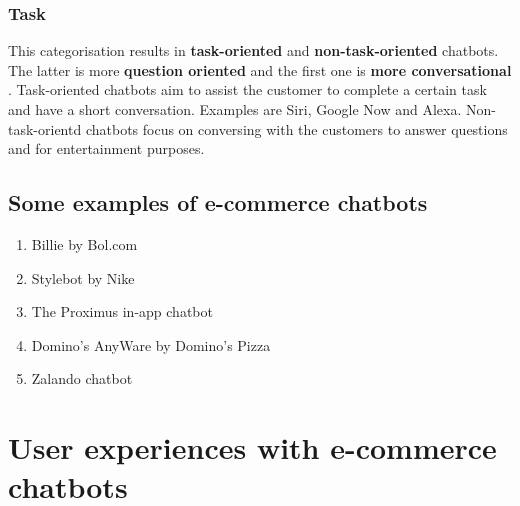 \subsubsection{Task}
This categorisation results in \textbf{task-oriented} and \textbf{non-task-oriented} chatbots. The latter is more \textbf{question oriented} and the first one is \textbf{more conversational} \citep{Nuruzzaman2018}. Task-oriented chatbots aim to assist the customer to complete a certain task and have a short conversation. Examples are Siri, Google Now and Alexa. Non-task-orientd chatbots focus on conversing with the customers to answer questions and for entertainment purposes. \citep{Nuruzzaman2018}\\

\subsection{Some examples of e-commerce chatbots}
\begin{enumerate}
	\item Billie by Bol.com
	\item Stylebot by Nike
	\item The Proximus in-app chatbot
	\item Domino's AnyWare by Domino's Pizza
	\item Zalando chatbot
\end{enumerate}

\section{User experiences with e-commerce chatbots}
